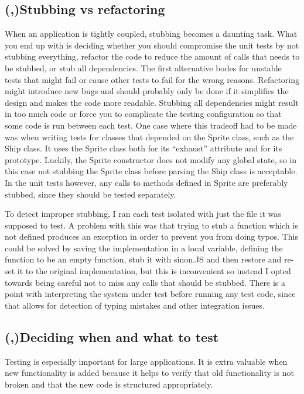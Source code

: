 \documentclass[11pt]{article}
\begin{document}
\subsection{(,)Stubbing vs refactoring}

When an application is tightly coupled, stubbing becomes a daunting task. What you end up with is deciding whether you should compromise the unit tests by not stubbing everything, refactor the code to reduce the amount of calls that needs to be stubbed, or stub all dependencies. The first alternative bodes for unstable tests that might fail or cause other tests to fail for the wrong reasons. Refactoring might introduce new bugs and should probably only be done if it simplifies the design and makes the code more readable. Stubbing all dependencies might result in too much code or force you to complicate the testing configuration so that some code is run between each test. One case where this tradeoff had to be made was when writing tests for classes that depended on the Sprite class, such as the Ship class. It uses the Sprite class both for its ``exhaust'' attribute and for its prototype. Luckily, the Sprite constructor does not modify any global state, so in this case not stubbing the Sprite class before parsing the Ship class is acceptable. In the unit tests however, any calls to methods defined in Sprite are preferably stubbed, since they should be tested separately.

To detect improper stubbing, I ran each test isolated with just the file it was supposed to test. A problem with this was that trying to stub a function which is not defined produces an exception in order to prevent you from doing typos. This could be solved by saving the implementation in a local variable, defining the function to be an empty function, stub it with sinon.JS and then restore and re-set it to the original implementation, but this is inconvenient so instead I opted towards being careful not to miss any calls that should be stubbed. There is a point with interpreting the system under test before running any test code, since that allows for detection of typing mistakes and other integration issues.

\subsection{(,)Deciding when and what to test}

Testing is especially important for large applications. It is extra valuable when new functionality is added because it helps to verify that old functionality is not broken and that the new code is structured appropriately. \cite[questions~6-7]{Stenmark}
\end{document}
